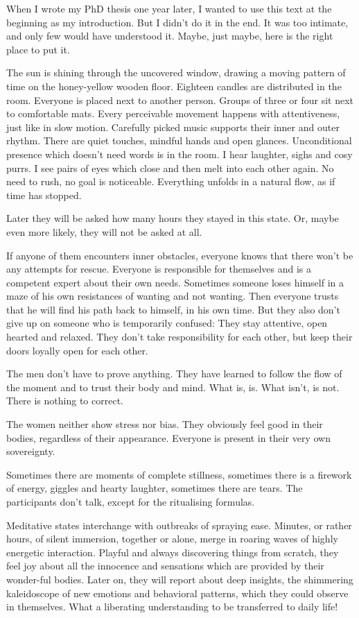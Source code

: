 When I wrote my PhD thesis one year later, I wanted to use this text at the beginning as my introduction. But I didn’t do it in the end. It was too intimate, and only few would have understood it. Maybe, just maybe, here is the right place to put it.

The sun is shining through the uncovered window, drawing a moving pattern of time on the honey-yellow wooden floor. Eighteen candles are distributed in the room. Everyone is placed next to another person. Groups of three or four sit next to comfortable mats. Every perceivable movement happens with attentiveness, just like in slow motion. Carefully picked music supports their inner and outer rhythm. There are quiet touches, mindful hands and open glances. Unconditional presence which doesn't need words is in the room. I hear laughter, sighs and cosy purrs. I see pairs of eyes which close and then melt into each other again. No need to rush, no goal is noticeable. Everything unfolds in a natural flow, as if time has stopped.

Later they will be asked how many hours they stayed in this state. Or, maybe even more likely, they will not be asked at all.

If anyone of them encounters inner obstacles, everyone knows that there won't be any attempts for rescue. Everyone is responsible for themselves and is a competent expert about their own needs.
Sometimes someone loses himself in a maze of his own resistances of wanting and not wanting. Then everyone trusts that he will find his path back to himself, in his own time. But they also don't give up on someone who is temporarily confused: They stay attentive, open hearted and relaxed. They don't take responsibility for each other, but keep their doors loyally open for each other.

The men don't have to prove anything. They have learned to follow the flow of the moment and to trust their body and mind. What is, is. What isn't, is not. There is nothing to correct.

The women neither show stress nor bias. They obviously feel good in their bodies, regardless of their appearance. Everyone is present in their very own sovereignty.

Sometimes there are moments of complete stillness, sometimes there is a firework of energy, giggles and hearty laughter, sometimes there are tears. The participants don't talk, except for the ritualising formulas.

Meditative states interchange with outbreaks of spraying ease. Minutes, or rather hours, of silent immersion, together or alone, merge in roaring waves of highly energetic interaction. Playful and always discovering things from scratch, they feel joy about all the innocence and sensations which are provided by their wonder-ful bodies. Later on, they will report about deep insights, the shimmering kaleidoscope of new emotions and behavioral patterns, which they could observe in themselves. What a liberating understanding to be transferred to daily life!

